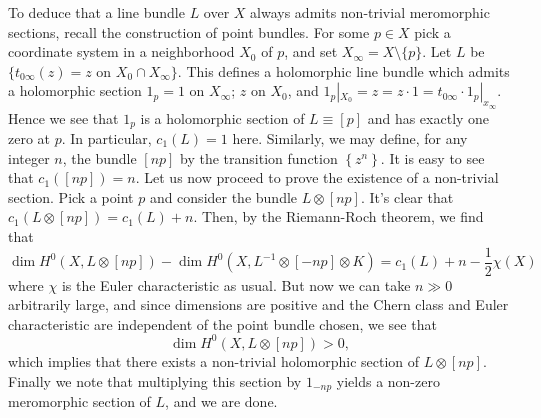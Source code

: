 \documentclass{../mathnotes}
\begin{document}
To deduce that a line bundle $L$ over $X$ always admits non-trivial meromorphic sections, recall the construction of point bundles. For some $p\in X$
pick a coordinate system in a neighborhood $X_0$ of $p$, and set $X_\infty=X\setminus\{p\}$. Let $L$ be $\{t_{0\infty}(z)=z\text{ on }X_0\cap X_\infty\}$. This defines
a holomorphic line bundle which admits a holomorphic section $1_p=1$ on $X_\infty$; $z$ on $X_0$, and $1_p|_{X_0}=z=z\cdot 1=t_{0\infty}\cdot 1_p|_{x_\infty}$.
Hence we see that $1_p$ is a holomorphic section of $L\equiv [p]$ and has exactly one zero at $p$. In particular, $c_1(L)=1$ here. Similarly, we may define, for any
integer $n$, the bundle $[np]$ by the transition function $\left\{ z^n \right\}$. It is easy to see that $c_1([np])=n$. Let us now proceed to prove the existence of
a non-trivial section. Pick a point $p$ and consider the bundle $L\otimes [np]$. It's clear that $c_1(L\otimes [np])=c_1(L)+n$. Then, by the Riemann-Roch theorem,
we find that
\[\dim H^0(X,L\otimes [np])-\dim H^0(X,L^{-1}\otimes [-np]\otimes K)=c_1(L)+n-\frac{1}{2}\chi(X)\]
where $\chi$ is the Euler characteristic as usual. But now we can take $n\gg 0$ arbitrarily large, and since dimensions are positive and the Chern class
and Euler characteristic are independent of the point bundle chosen, we see that
\[\dim H^0(X,L\otimes[np])>0,\]
which implies that there exists a non-trivial holomorphic section of $L\otimes [np]$. Finally we note that multiplying this section by $1_{-np}$ yields a non-zero
meromorphic section of $L$, and we are done.

\end{document}
